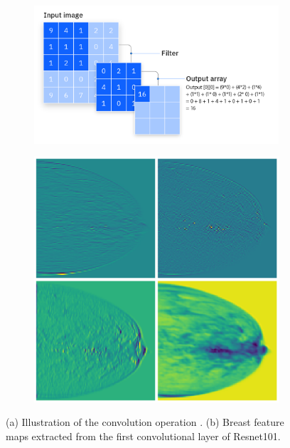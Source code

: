 \documentclass[a4paper,10pt]{book}
\begin{document}
\begin{figure}[h!]
	\centering
	\begin{subfigure}[c]{0.45\textwidth}
		\centering
		\includegraphics[width=\textwidth]{reports/assets/convolution.png}
            \caption{}
		\label{fig:convolution}
	\end{subfigure}
	\begin{subfigure}[c]{0.25\textwidth}
		\centering
		\includegraphics[width=\textwidth]{reports/assets/feature_maps_resnet.png}
            \caption{}
		\label{fig:feature_map_conv}
	\end{subfigure}
	\caption[Convolution and feature map]{(a) Illustration of the convolution operation \cite{noauthor_what_2021}. (b) Breast feature maps extracted from the first convolutional layer of Resnet101.}
\label{fig:convolution_feature_map}
\end{figure}
\end{document}
